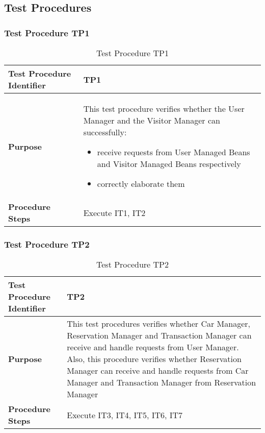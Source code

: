 \subsection{Test Procedures}
\subsubsection{Test Procedure TP1} \label{sssec:TP1}
\vspace{16pt}
\begin{table}[htbp]
\begin{center}
\renewcommand{\arraystretch}{1.5}
\begin{tabular}{l|p{}}
\hline
\textbf{Test Procedure Identifier} & TP1\\
\hline
\textbf{Purpose} &  \begin{minipage}[t]{0.6\textwidth}
This test procedure verifies whether the User Manager and the Visitor Manager can successfully:
\begin{itemize}
\addtolength{\itemindent}{0.5cm}
\item receive requests from User Managed Beans and Visitor Managed Beans respectively
\item correctly elaborate them
\vspace{2,5mm}
\end{itemize}
\end{minipage} \\
\hline
\textbf{Procedure Steps} & Execute IT1, IT2 \\
\hline
\end{tabular}
\caption{Test Procedure TP1}
\end{center}
\end{table}

\subsubsection{Test Procedure TP2} \label{sssec:TP2}
\vspace{16pt}
\begin{table}[htbp]
\begin{center}
\renewcommand{\arraystretch}{1.5}
\begin{tabular}{l|p{}}
\hline
\textbf{Test Procedure Identifier} & TP2\\
\hline
\textbf{Purpose} &  This test procedures verifies whether Car Manager, Reservation Manager and Transaction Manager can receive and handle requests from User Manager. Also, this procedure verifies whether Reservation Manager can receive and handle requests from Car Manager and Transaction Manager from Reservation Manager \\
\hline
\textbf{Procedure Steps} & Execute IT3, IT4, IT5, IT6, IT7 \\
\hline
\end{tabular}
\caption{Test Procedure TP2}
\end{center}
\end{table}
\clearpage

